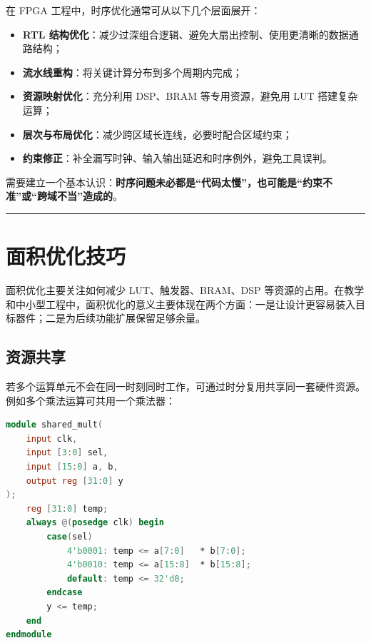 在 FPGA 工程中，时序优化通常可从以下几个层面展开：

\begin{itemize}
\tightlist
\item
  \textbf{RTL
  结构优化}：减少过深组合逻辑、避免大扇出控制、使用更清晰的数据通路结构；
\item
  \textbf{流水线重构}：将关键计算分布到多个周期内完成；
\item
  \textbf{资源映射优化}：充分利用 DSP、BRAM 等专用资源，避免用 LUT
  搭建复杂运算；
\item
  \textbf{层次与布局优化}：减少跨区域长连线，必要时配合区域约束；
\item
  \textbf{约束修正}：补全漏写时钟、输入输出延迟和时序例外，避免工具误判。
\end{itemize}

需要建立一个基本认识：\textbf{时序问题未必都是``代码太慢''，也可能是``约束不准''或``跨域不当''造成的}。

\begin{center}\rule{0.5\linewidth}{0.5pt}\end{center}

\section{面积优化技巧}\label{ux9762ux79efux4f18ux5316ux6280ux5de7}

面积优化主要关注如何减少 LUT、触发器、BRAM、DSP
等资源的占用。在教学和中小型工程中，面积优化的意义主要体现在两个方面：一是让设计更容易装入目标器件；二是为后续功能扩展保留足够余量。

\subsection{资源共享}\label{ux8d44ux6e90ux5171ux4eab}

若多个运算单元不会在同一时刻同时工作，可通过时分复用共享同一套硬件资源。例如多个乘法运算可共用一个乘法器：

\begin{lstlisting}[language=Verilog]
module shared_mult(
    input clk,
    input [3:0] sel,
    input [15:0] a, b,
    output reg [31:0] y
);
    reg [31:0] temp;
    always @(posedge clk) begin
        case(sel)
            4'b0001: temp <= a[7:0]   * b[7:0];
            4'b0010: temp <= a[15:8]  * b[15:8];
            default: temp <= 32'd0;
        endcase
        y <= temp;
    end
endmodule
\end{lstlisting}

